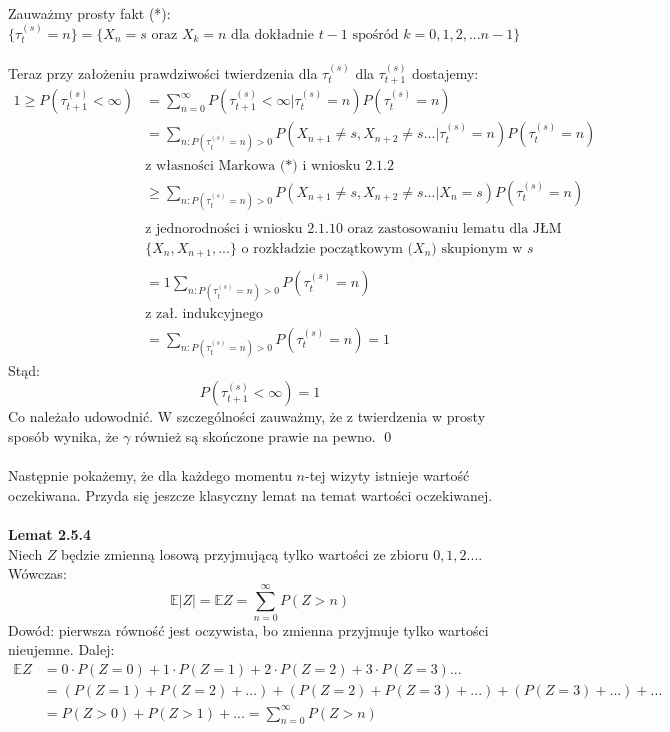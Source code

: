 \documentclass[a4paper]{article}
\begin{document}
\\
Zauważmy prosty fakt (*):
$$\{\tau_t^{(s)} = n\} = \{X_n = s \,\,\text{oraz}\,\, X_k = n \,\, \text{dla dokładnie}\,\, t-1\,\, \text{spośród}\,\, k = 0,1,2,...n-1\}$$
\\
Teraz przy założeniu prawdziwości twierdzenia dla $\tau_{t}^{(s)}$ dla $\tau_{t+1}^{(s)}$ dostajemy: \\
\begin{align*}
1 \geq P(\tau_{t+1}^{(s)} < \infty) &= \sum_{n = 0}^{\infty} P(\tau_{t+1}^{(s)} < \infty| \tau_{t}^{(s)} = n)P(\tau_{t}^{(s)} = n)\\
&= \sum_{n: P(\tau_{t}^{(s)} = n) > 0} P(X_{n+1} \neq s, X_{n+2} \neq s ...| \tau_{t}^{(s)} = n) P(\tau_{t}^{(s)} = n) \\
&\text{z własności Markowa (*) i wniosku 2.1.2}\\
&\geq \sum_{n: P(\tau_{t}^{(s)} = n) > 0} P(X_{n+1} \neq s, X_{n+2} \neq s ... |X_n = s) P(\tau_{t}^{(s)} = n) \\\\
& \text{z jednorodności i wniosku 2.1.10 oraz zastosowaniu lematu dla JŁM}\\
&\text{$\{X_n, X_{n+1}, ...\}$ o rozkładzie początkowym ($X_n$) skupionym w $s$}\\\\
&= 1\sum_{n: P(\tau_{t}^{(s)} = n) > 0} P(\tau_{t}^{(s)} = n)\\
& \text{z zał. indukcyjnego}\\
&= \sum_{n: P(\tau_{t}^{(s)} = n) > 0} P(\tau_{t}^{(s)} = n) = 1
\end{align*}
Stąd:
$$P(\tau_{t+1}^{(s)} < \infty) = 1$$
Co należało udowodnić. W szczególności zauważmy, że z twierdzenia w prosty sposób wynika, że $\gamma$ również są skończone prawie na pewno. \qed
\\\\
Następnie pokażemy, że dla każdego momentu $n$-tej wizyty istnieje wartość oczekiwana. Przyda się jeszcze klasyczny lemat na temat wartości oczekiwanej.
\\\\
\textbf{Lemat 2.5.4}\\
Niech $Z$ będzie zmienną losową przyjmującą tylko wartości ze zbioru $0,1,2...$. Wówczas:
$$\mathbb{E}|Z| = \mathbb{E}Z = \sum\limits_{n = 0}^{\infty} P(Z > n)$$
Dowód: pierwsza równość jest oczywista, bo zmienna przyjmuje tylko wartości nieujemne. Dalej:
\begin{align*}
    \mathbb{E}Z &= 0 \cdot P(Z = 0) + 1 \cdot P(Z = 1) + 2 \cdot P(Z = 2) + 3 \cdot P(Z = 3)... \\
    &= (P(Z = 1) + P(Z = 2) + ...) + (P(Z = 2) + P(Z = 3) + ...) + (P(Z = 3) + ...) + ...\\
    &= P(Z > 0) + P(Z > 1) + ... = \sum\limits_{n = 0}^{\infty} P(Z > n)
\end{align*}
\end{document}
